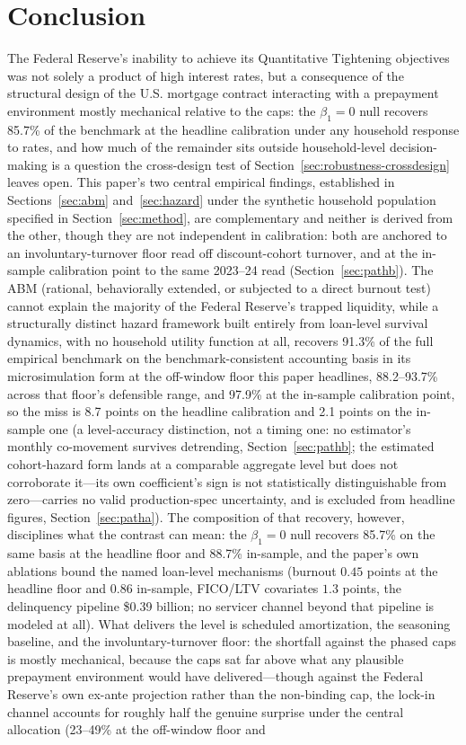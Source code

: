 \documentclass[12pt]{article}
\begin{document}
\section{Conclusion}\label{sec:conclusion}

The Federal Reserve's inability to achieve its Quantitative Tightening objectives was not solely a product of high interest rates, but a consequence of the structural design of the U.S. mortgage contract interacting with a prepayment environment mostly mechanical relative to the caps: the $\beta_1 = 0$ null recovers 85.7\% of the benchmark at the headline calibration under any household response to rates, and how much of the remainder sits outside household-level decision-making is a question the cross-design test of Section~\ref{sec:robustness-crossdesign} leaves open. This paper's two central empirical findings, established in Sections~\ref{sec:abm} and~\ref{sec:hazard} under the synthetic household population specified in Section~\ref{sec:method}, are complementary and neither is derived from the other, though they are not independent in calibration: both are anchored to an involuntary-turnover floor read off discount-cohort turnover, and at the in-sample calibration point to the same 2023--24 read (Section~\ref{sec:pathb}). The ABM (rational, behaviorally extended, or subjected to a direct burnout test) cannot explain the majority of the Federal Reserve's trapped liquidity, while a structurally distinct hazard framework built entirely from loan-level survival dynamics, with no household utility function at all, recovers 91.3\% of the full empirical benchmark on the benchmark-consistent accounting basis in its microsimulation form at the off-window floor this paper headlines, 88.2--93.7\% across that floor's defensible range, and 97.9\% at the in-sample calibration point, so the miss is 8.7 points on the headline calibration and 2.1 points on the in-sample one (a level-accuracy distinction, not a timing one: no estimator's monthly co-movement survives detrending, Section~\ref{sec:pathb}; the estimated cohort-hazard form lands at a comparable aggregate level but does not corroborate it---its own coefficient's sign is not statistically distinguishable from zero---carries no valid production-spec uncertainty, and is excluded from headline figures, Section~\ref{sec:patha}). The composition of that recovery, however, disciplines what the contrast can mean: the $\beta_1 = 0$ null recovers 85.7\% on the same basis at the headline floor and 88.7\% in-sample, and the paper's own ablations bound the named loan-level mechanisms (burnout $0.45$ points at the headline floor and $0.86$ in-sample, FICO/LTV covariates $1.3$ points, the delinquency pipeline \$0.39 billion; no servicer channel beyond that pipeline is modeled at all). What delivers the level is scheduled amortization, the seasoning baseline, and the involuntary-turnover floor: the shortfall against the phased caps is mostly mechanical, because the caps sat far above what any plausible prepayment environment would have delivered---though against the Federal Reserve's own ex-ante projection rather than the non-binding cap, the lock-in channel accounts for roughly half the genuine surprise under the central allocation (23--49\% at the off-window floor and 
\end{document}
